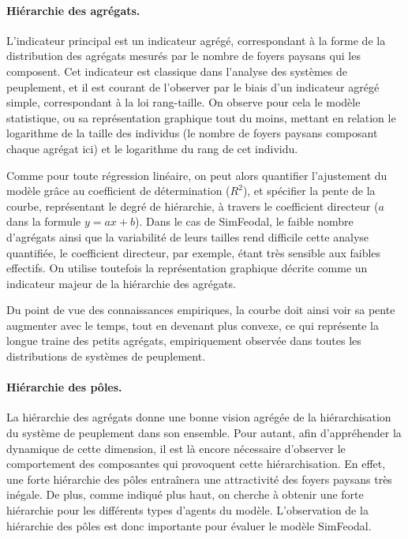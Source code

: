 \paragraph{Hiérarchie des agrégats.}

L'indicateur principal est un indicateur agrégé, correspondant à la forme de la distribution des agrégats mesurés par le nombre de foyers paysans qui les composent.
Cet indicateur est classique dans l'analyse des systèmes de peuplement, et il est courant de l'observer par le biais d'un indicateur agrégé simple, correspondant à la loi rang-taille.
On observe pour cela le modèle statistique, ou sa représentation graphique tout du moins, mettant en relation le logarithme de la taille des individus (le nombre de foyers paysans composant chaque agrégat ici) et le logarithme du rang de cet individu.

Comme pour toute régression linéaire, on peut alors quantifier l'ajustement du modèle grâce au coefficient de détermination ($R^2$), et spécifier la pente de la courbe, représentant le degré de hiérarchie, à travers le coefficient directeur ($a$ dans la formule $y = ax + b$).
Dans le cas de SimFeodal, le faible nombre d'agrégats ainsi que la variabilité de leurs tailles rend difficile cette analyse quantifiée, le coefficient directeur, par exemple, étant très sensible aux faibles effectifs.
On utilise toutefois la représentation graphique décrite comme un indicateur majeur de la hiérarchie des agrégats.

Du point de vue des connaissances empiriques, la courbe doit ainsi voir sa pente augmenter avec le temps, tout en devenant plus convexe, ce qui représente la \og longue traine\fg{} des petits agrégats, empiriquement observée dans toutes les distributions de systèmes de peuplement.

\paragraph{Hiérarchie des pôles.}

La hiérarchie des agrégats donne une bonne vision agrégée de la hiérarchisation du système de peuplement dans son ensemble.
Pour autant, afin d'appréhender la dynamique de cette dimension, il est là encore nécessaire d'observer le comportement des composantes qui provoquent cette hiérarchisation.
En effet, une forte hiérarchie des pôles entraînera une attractivité des foyers paysans très inégale.
De plus, comme indiqué plus haut, on cherche à obtenir une forte hiérarchie pour les différents types d'agents du modèle.
L'observation de la hiérarchie des pôles est donc importante pour évaluer le modèle SimFeodal.

